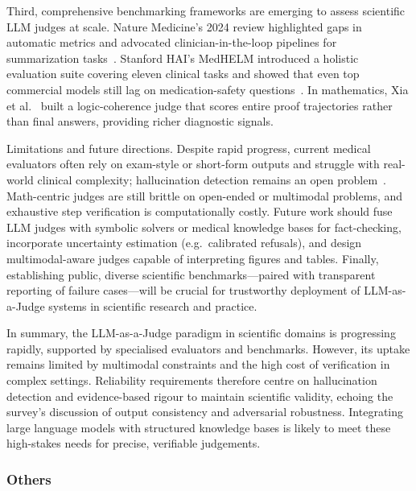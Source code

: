 \documentclass[acmsmall,screen]{acmart}
\begin{document}
Third, comprehensive benchmarking frameworks are emerging to assess scientific LLM judges at scale. Nature Medicine’s 2024 review highlighted gaps in automatic metrics and advocated clinician-in-the-loop pipelines for summarization tasks~\cite{naturemed2024summ}. Stanford HAI’s MedHELM introduced a holistic evaluation suite covering eleven clinical tasks and showed that even top commercial models still lag on medication-safety questions~\cite{medhelm2024}. In mathematics, Xia et al.~\cite{xia2024logicjudge} built a logic-coherence judge that scores entire proof trajectories rather than final answers, providing richer diagnostic signals.

Limitations and future directions.  Despite rapid progress, current medical evaluators often rely on exam-style or short-form outputs and struggle with real-world clinical complexity; hallucination detection remains an open problem~\cite{medhelm2024}. Math-centric judges are still brittle on open-ended or multimodal problems, and exhaustive step verification is computationally costly. Future work should fuse LLM judges with symbolic solvers or medical knowledge bases for fact-checking, incorporate uncertainty estimation (e.g.\ calibrated refusals), and design multimodal-aware judges capable of interpreting figures and tables. Finally, establishing public, diverse scientific benchmarks—paired with transparent reporting of failure cases—will be crucial for trustworthy deployment of LLM-as-a-Judge systems in scientific research and practice.

In summary, the LLM-as-a-Judge paradigm in scientific domains is progressing rapidly, supported by specialised evaluators and benchmarks. However, its uptake remains limited by multimodal constraints and the high cost of verification in complex settings. Reliability requirements therefore centre on hallucination detection and evidence-based rigour to maintain scientific validity, echoing the survey’s discussion of output consistency and adversarial robustness. Integrating large language models with structured knowledge bases is likely to meet these high-stakes needs for precise, verifiable judgements.

\subsubsection{\textbf{Others}}
\end{document}
